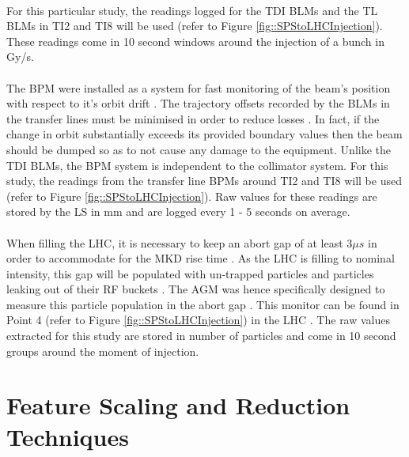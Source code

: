 \paragraph{ }For this particular study, the readings logged for the \ac{TDI} \acs{BLM}s and the \ac{TL} \acs{BLM}s in TI2 and TI8 will be used (refer to Figure \ref{fig::SPStoLHCInjection}). These readings come in 10 second windows around the injection of a bunch in \ac{Gy/s}.

\paragraph{ }The \ac{BPM} were installed as a system for fast monitoring of the beam's position with respect to it's orbit drift \cite{Schmidt2006}. The trajectory offsets recorded by the \acs{BLM}s in the transfer lines must be minimised in order to reduce losses \cite{Drosdal2011}. In fact, if the change in orbit substantially exceeds its provided boundary values then the beam should be dumped \cite{Schmidt2006} so as to not cause any damage to the equipment. Unlike the \acs{TDI} \acs{BLM}s, the \acs{BPM} system is independent to the collimator system. For this study, the readings from the transfer line \acs{BPM}s around TI2 and TI8 will be used (refer to Figure \ref{fig::SPStoLHCInjection}). Raw values for these readings are stored by the \acs{LS} in \ac{mm} and are logged every 1 - 5 seconds on average.

\paragraph{ }When filling the \acs{LHC}, it is necessary to keep an abort gap of at least 3$\mu s$ in order to accommodate for the \ac{MKD} rise time \cite{Meddahi2010}. As the \ac{LHC} is filling to nominal intensity, this gap will be populated with un-trapped particles and particles leaking out of their \ac{RF} buckets \cite{Meddahi2010}. The \ac{AGM} was hence specifically designed to measure this particle population in the abort gap \cite{Lefevre2010}. This monitor can be found in Point 4 (refer to Figure \ref{fig::SPStoLHCInjection}) in the LHC \cite{Lefevre2010}. The raw values extracted for this study are stored in number of particles and come in 10 second groups around the moment of injection.
 



\section{Feature Scaling and Reduction Techniques}

